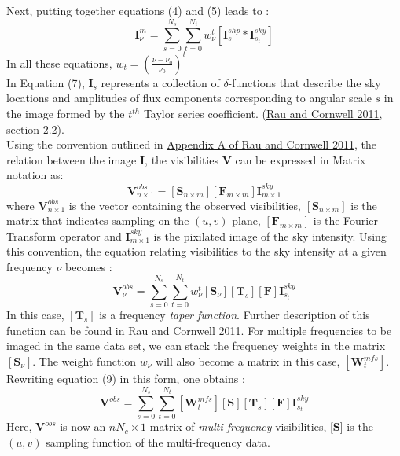 \documentclass{article}
\begin{document}
Next, putting together equations (4) and (5) leads to : 
\begin{equation}
\textbf{I}_\nu^{m} = \sum_{s=0}^{N_s}\sum_{t=0}^{N_t}w_\nu^{t}[\textbf{I}_s^{shp} *\textbf{I}_{s_t}^{sky}]
\end{equation}
In all these equations, $w_t = (\frac{\nu - \nu_0}{\nu_0})^{t}$\\
In Equation (7), $\textbf{I}_s$ represents a collection of $\delta$-functions that describe the sky locations and amplitudes of flux components corresponding to angular scale $s$ in the image formed by the $t^{th}$ Taylor series coefficient. (\hyperref[urvpaper]{Rau and Cornwell 2011}, section 2.2).\\
Using the convention outlined in \hyperref[urvpaper]{Appendix A of Rau and Cornwell 2011}, the relation between the image \textbf{I}, the visibilities \textbf{V} can be expressed in Matrix notation as:
\begin{equation}
\textbf{V}_{n\times1}^{obs} = [\textbf{S}_{n\times m}][\textbf{F}_{m\times m}]\textbf{I}_{m\times 1}^{sky}
\end{equation}
	where $\textbf{V}_{n\times1}^{obs}$ is the vector containing the observed visibilities, $[\textbf{S}_{n\times m}]$ is the matrix that indicates sampling on the $(u,v)$ plane, $[\textbf{F}_{m\times m}]$ is the Fourier Transform operator and $\textbf{I}_{m\times 1}^{sky}$ is the pixilated image of the sky intensity. Using this convention, the equation relating visibilities to the sky intensity at a given frequency $\nu$ becomes : 
\begin{equation}
\textbf{V}_{\nu}^{obs} = \sum_{s=0}^{N_s}\sum_{t=0}^{N_t}w_\nu^{t}[\textbf{S}_{\nu}][\textbf{T}_s][\textbf{F}]\textbf{I}^{sky}_{s_{t}}
\end{equation}
In this case, $[\textbf{T}_s]$ is a frequency \textit{taper function}. Further description of this function can be found in \hyperref[urvpaper]{Rau and Cornwell 2011}.
For multiple frequencies to be imaged in the same data set, we can stack the frequency weights in the matrix $[\textbf{S}_{\nu}]$. The weight function $w_\nu$ will also become a matrix in this case, $[\textbf{W}_t^{mfs}]$. Rewriting equation (9) in this form, one obtains : 
\begin{equation}
\textbf{V}^{obs} = \sum_{s=0}^{N_s}\sum_{t=0}^{N_t}[\textbf{W}_t^{mfs}][\textbf{S}][\textbf{T}_s][\textbf{F}]\textbf{I}^{sky}_{s_{t}}
\end{equation}
Here, $\textbf{V}^{obs}$ is now an $nN_c\times 1$ matrix of \textit{multi-frequency} visibilities, [\textbf{S}] is the $(u,v)$ sampling function of the multi-frequency data.
\end{document}
